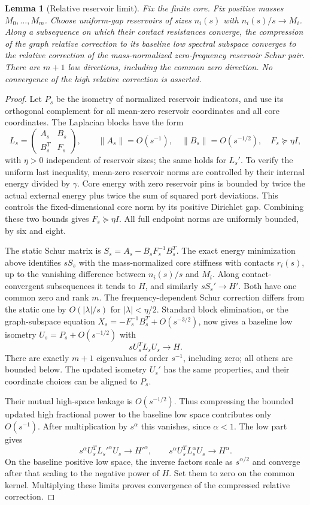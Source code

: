 \documentclass[11pt]{article}
\newtheorem{lemma}[theorem]{Lemma}
\begin{document}
\begin{lemma}[Relative reservoir limit]\label{lem:reservoir}
Fix the finite core. Fix positive masses $M_0,\ldots,M_m$.
Choose uniform-gap reservoirs of sizes $n_i(s)$ with $n_i(s)/s\to M_i$.
Along a subsequence on which their contact resistances converge, the
compression of the graph relative correction to its baseline low
spectral subspace converges to the relative correction of the
mass-normalized zero-frequency reservoir Schur pair.
There are $m+1$ low directions, including the common zero direction.
No convergence of the high relative correction is asserted.
\end{lemma}
\begin{proof}
Let $P_s$ be the isometry of normalized reservoir indicators, and use
its orthogonal complement for all mean-zero reservoir coordinates and
all core coordinates. The Laplacian blocks have the form
\[
 L_s=\begin{pmatrix}A_s&B_s\\B_s^T&F_s\end{pmatrix},\qquad
 \|A_s\|=O(s^{-1}),\quad\|B_s\|=O(s^{-1/2}),\quad F_s\succeq\eta I,
\]
with $\eta>0$ independent of reservoir sizes; the same holds for $L_s'$.
To verify the uniform last inequality, mean-zero reservoir norms are
controlled by their internal energy divided by $\gamma$. Core energy
with zero reservoir pins is bounded by twice the actual external energy
plus twice the sum of squared port deviations. This controls the
fixed-dimensional core norm by its positive Dirichlet gap. Combining
these two bounds gives $F_s\succeq\eta I$.
All full endpoint norms are uniformly bounded, by six and eight.

The static Schur matrix is $S_s=A_s-B_sF_s^{-1}B_s^T$.
The exact energy minimization above identifies $sS_s$ with the
mass-normalized core stiffness with contacts $r_i(s)$, up to the
vanishing difference between $n_i(s)/s$ and $M_i$.
Along contact-convergent subsequences it tends to $H$, and similarly
$sS_s'\to H'$. Both have one common zero and rank $m$.
The frequency-dependent Schur correction differs from the static one
by $O(|\lambda|/s)$ for $|\lambda|<\eta/2$.
Standard block elimination, or the graph-subspace equation
$X_s=-F_s^{-1}B_s^T+O(s^{-3/2})$, now gives a baseline low isometry
$U_s=P_s+O(s^{-1/2})$ with
\[
 sU_s^TL_sU_s\longrightarrow H.
\]
There are exactly $m+1$ eigenvalues of order $s^{-1}$, including zero;
all others are bounded below. The updated isometry $U_s'$ has the same
properties, and their coordinate choices can be aligned to $P_s$.

Their mutual high-space leakage is $O(s^{-1/2})$. Thus compressing
the bounded updated high fractional power to the baseline low space
contributes only $O(s^{-1})$. After multiplication by $s^\alpha$ this
vanishes, since $\alpha<1$. The low part gives
\[
 s^\alpha U_s^T L_s'^\alpha U_s\longrightarrow H'^\alpha,
 \qquad s^\alpha U_s^T L_s^\alpha U_s\longrightarrow H^\alpha.
\]
On the baseline positive low space, the inverse factors scale as
$s^{\alpha/2}$ and converge after that scaling to the negative power
of $H$. Set them to zero on the common kernel. Multiplying these
limits proves convergence of the compressed relative correction.
\end{proof}
\end{document}
